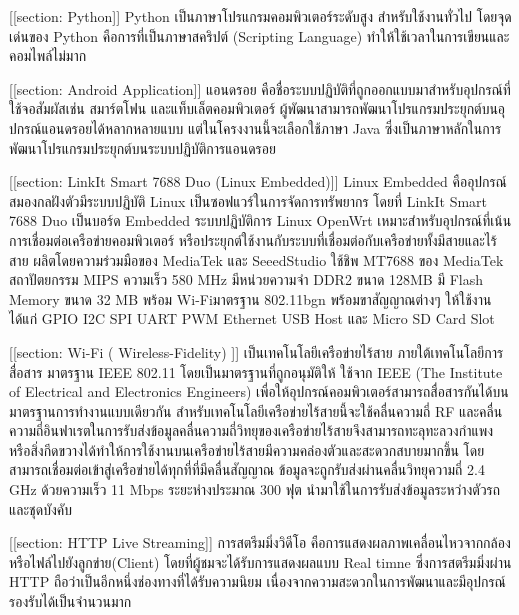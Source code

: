 [[section: Python]] 
	Python เป็นภาษาโปรแกรมคอมพิวเตอร์ระดับสูง สำหรับใช้งานทั่วไป
	โดยจุดเด่นของ Python คือการที่เป็นภาษาสคริปต์ (Scripting Language)
	ทำให้ใช้เวลาในการเขียนและคอมไพล์ไม่มาก

[[section: Android Application]]
    แอนดรอย คือชื่อระบบปฏิบัติที่ถูกออกแบบมาสำหรับอุปกรณ์ที่ใช้จอสัมผัสเช่น สมาร์ตโฟน และแท็บเล็ตคอมพิวเตอร์ ผู้พัฒนาสามารถพัฒนาโปรแกรมประยุกต์บนอุปกรณ์แอนดรอยได้หลากหลายแบบ 
    แต่ในโครงงานนี้จะเลือกใช้ภาษา Java ซึ่งเป็นภาษาหลักในการพัฒนาโปรแกรมประยุกต์บนระบบปฏิบัติการแอนดรอย


[[section: LinkIt Smart 7688 Duo (Linux Embedded)]]
    Linux Embedded คืออุปกรณ์สมองกลฝังตัวมีระบบปฏิบัติ Linux เป็นซอฟแวร์ในการจัดการทรัพยากร 
    โดยที่ LinkIt Smart 7688 Duo เป็นบอร์ด Embedded ระบบปฏิบัติการ Linux OpenWrt  เหมาะสำหรับอุปกรณ์ที่เน้นการเชื่อมต่อเครือข่ายคอมพิวเตอร์ 
    หรือประยุกต์ใช้งานกับระบบที่เชื่อมต่อกับเครือข่ายทั้งมีสายและไร้สาย ผลิตโดยความร่วมมือของ MediaTek และ SeeedStudio ใช้ชิพ MT7688 ของ MediaTek 
    สถาปัตยกรรม MIPS ความเร็ว 580 MHz มีหน่วยความจำ DDR2 ขนาด 128MB มี Flash Memory ขนาด 32 MB พร้อม Wi-Fiมาตรฐาน 802.11bgn พร้อมขาสัญญาณต่างๆ 
    ให้ใช้งาน ได้แก่ GPIO I2C SPI UART PWM Ethernet USB Host และ Micro SD Card Slot

[[section: Wi-Fi  ( Wireless-Fidelity)  ]]
    เป็นเทคโนโลยีเครือข่ายไร้สาย  ภายใต้เทคโนโลยีการสื่อสาร มาตรฐาน IEEE  802.11  โดยเป็นมาตรฐานที่ถูกอนุมัติให้ ใช้จาก IEEE (The Institute of Electrical and Electronics Engineers) 
    เพื่อให้อุปกรณ์คอมพิวเตอร์สามารถสื่อสารกันได้บนมาตรฐานการทำงานแบบเดียวกัน  สำหรับเทคโนโลยีเครือข่ายไร้สายนี้จะใช้คลื่นความถี่ RF 
    และคลื่นความถี่อินฟาเรตในการรับส่งข้อมูลคลื่นความถี่วิทยุของเครือข่ายไร้สายจึงสามารถทะลุทะลวงกำแพงหรือสิ่งกีดขวางได้ทำให้การใช้งานบนเครือข่ายไร้สายมีความคล่องตัวและสะดวกสบายมากขึ้น 
    โดยสามารถเชื่อมต่อเข้าสู่เครือข่ายได้ทุกที่ที่มีคลื่นสัญญาณ  ข้อมูลจะถูกรับส่งผ่านคลื่นวิทยุความถี่   2.4 GHz  ด้วยความเร็ว  11 Mbps  ระยะห่างประมาณ  300 ฟุต นำมาใช้ในการรับส่งข้อมูลระหว่างตัวรถและชุดบังคับ
 
[[section: HTTP Live Streaming]]
    การสตรีมมิ่งวิดีโอ คือการแสดงผลภาพเคลื่อนไหวจากกล้องหรือไฟล์ไปยังลูกข่าย(Client) โดยที่ผู้ชมจะได้รับการแสดงผลแบบ Real timne ซึ่งการสตรีมมิ่งผ่าน HTTP ถือว่าเป็นอีกหนึ่งช่องทางที่ได้รับความนิยม 
    เนื่องจากความสะดวกในการพัฒนาและมีอุปกรณ์รองรับได้เป็นจำนวนมาก


